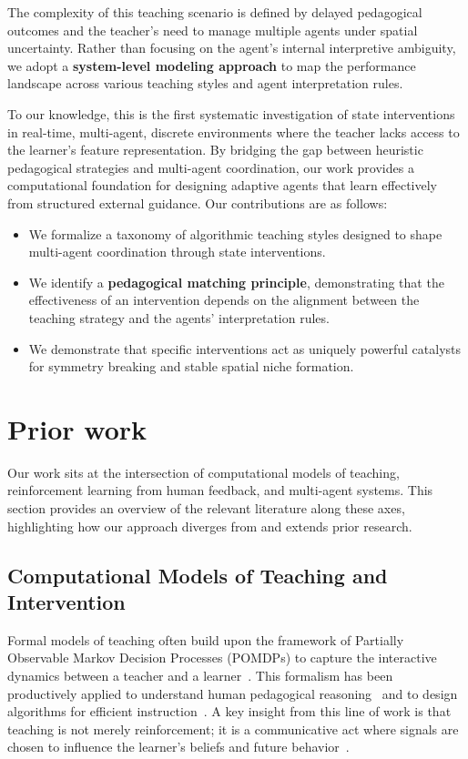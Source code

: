 \documentclass[10pt,letterpaper]{article}
\begin{document}
The complexity of this teaching scenario is defined by delayed pedagogical outcomes and the teacher's need to manage multiple agents under spatial uncertainty. Rather than focusing on the agent's internal interpretive ambiguity, we adopt a \textbf{system-level modeling approach} to map the performance landscape across various teaching styles and agent interpretation rules.

To our knowledge, this is the first systematic investigation of state interventions in real-time, multi-agent, discrete environments where the teacher lacks access to the learner's feature representation. By bridging the gap between heuristic pedagogical strategies and multi-agent coordination, our work provides a computational foundation for designing adaptive agents that learn effectively from structured external guidance. Our contributions are as follows:

\begin{itemize}
    \item We formalize a taxonomy of algorithmic teaching styles designed to shape multi-agent coordination through state interventions.
    \item We identify a \textbf{pedagogical matching principle}, demonstrating that the effectiveness of an intervention depends on the alignment between the teaching strategy and the agents' interpretation rules.
    \item We demonstrate that specific interventions act as uniquely powerful catalysts for symmetry breaking and stable spatial niche formation.
\end{itemize}

\section{Prior work}

Our work sits at the intersection of computational models of teaching, reinforcement learning from human feedback, and multi-agent systems. This section provides an overview of the relevant literature along these axes, highlighting how our approach diverges from and extends prior research.

\subsection{Computational Models of Teaching and Intervention}

Formal models of teaching often build upon the framework of Partially Observable Markov Decision Processes (POMDPs) to capture the interactive dynamics between a teacher and a learner~\cite{kaelbling1998}. This formalism has been productively applied to understand human pedagogical reasoning~\cite{shafto2014} and to design algorithms for efficient instruction~\cite{rafferty2016}. A key insight from this line of work is that teaching is not merely reinforcement; it is a communicative act where signals are chosen to influence the learner's beliefs and future behavior~\cite{ho2019people, ho2021}.
\end{document}

